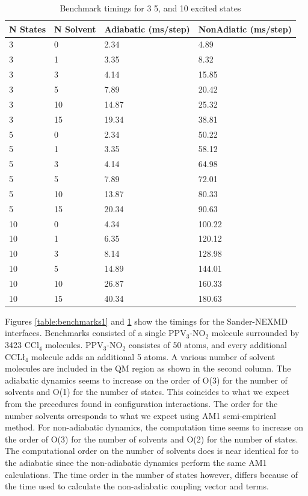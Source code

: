    \begin{table}[H]
      \caption{Benchmark timings for 3 5, and 10 excited states}
      \label{table:benchmarks2}
      \begin{tabularx}{\textwidth}{XXXX}\hline
N States & N Solvent & Adiabatic (ms/step) & NonAdiatic (ms/step)\\\hline
3        & 0         &  2.34 & 4.89\\
3        & 1         &  3.35 & 8.32\\
3        & 3         &  4.14 & 15.85\\
3        & 5         &  7.89 & 20.42\\
3        & 10        & 14.87 & 25.32\\
3        & 15        & 19.34 & 38.81\\
5        & 0         &  2.34 & 50.22\\
5        & 1         &  3.35 & 58.12\\
5        & 3         &  4.14 & 64.98\\
5        & 5         &  7.89 & 72.01\\
5        & 10        & 13.87 & 80.33\\
5        & 15        & 20.34 & 90.63\\
10        & 0         &  4.34 & 100.22\\
10        & 1         &  6.35 & 120.12\\
10        & 3         &  8.14 & 128.98\\
10        & 5         &  14.89 & 144.01\\
10        & 10        & 26.87 & 160.33\\
10        & 15        & 40.34 & 180.63\\\hline
      \end{tabularx}
    \end{table}

Figures \ref{table:benchmarks1} and \ref{table:benchmarks2} show the timings for the Sander-NEXMD interfaces. 
Benchmarks consisted of a single PPV\(_3\)-NO\(_2\) molecule surrounded by 3423 CCl\(_4\) molecules.
PPV\(_3\)-NO\(_2\) consistes of 50 atoms, and every additional CCL\l\(_4\) molecule adds an additional 5 atoms.
A various number of solvent molecules are included in the QM region as shown in the second column.
The adiabatic dynamics seems to increase on the order of O(3) for the number of solvents and O(1) for the number of states.
This coincides to what we expect from the precedures found in configuration interactions.
The order for the number solvents orresponds to what we expect using AM1 semi-empirical method.
For non-adiabatic dynamics, the computation time seems to increase on the order of O(3) for the number of solvents and O(2) for the number of states.
The computational order on the number of solvents does is near identical for to the adiabatic since the non-adiabatic dynamics perform the same AM1 calculations.
The time order in the number of states however, differs because of the time used to calculate the non-adiabatic coupling vector and terms.
